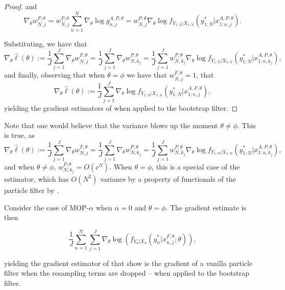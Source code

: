\documentclass{article}
\begin{document}
\begin{proof}
and 
$$\nabla_\theta w_{N,j}^{P,\theta} = w_{N,j}^{P,\theta} \sum_{n=1}^N \nabla_\theta \log g_{n,j}^{A,P,\theta} = w_{N,j}^{P,\theta} \nabla_\theta \log f_{Y_{1:N}|X_{1:N}}\left(y_{1:N}^* | x_{1:n,j}^{A, P,\theta}\right).$$

Substituting, we have that
\begin{equation*}
    \nabla_\theta \hat{\ell}(\theta) := \frac{1}{J}\sum_{j=1}^J \nabla_\theta w_{N,j}^{F,\theta} =\frac{1}{J}\sum_{j=1}^J \nabla_\theta w_{N,k_j}^{P,\theta} = \frac{1}{J}\sum_{j=1}^J w_{N,k_j}^{P,\theta} \nabla_\theta \log f_{Y_{1:N}|X_{1:N}}\left(y_{1:N}^* | x_{1:n,k_j}^{A, P,\theta}\right),
\end{equation*}
and finally, observing that when $\theta=\phi$ we have that $w_{N,j}^{F,\theta}=1$, that 
\begin{equation*}
    \nabla_\theta \hat{\ell}(\theta) := \frac{1}{J}\sum_{j=1}^J \nabla_\theta \log f_{Y_{1:N}|X_{1:N}}\left(y_{1:N}^* | x_{1:n,j}^{A, F,\theta}\right),
\end{equation*}
yielding the gradient estimators of \cite{poyiadjis11, scibior2021dpf} when applied to the bootstrap filter. 
\end{proof}

Note that one would believe that the variance blows up the moment $\theta\neq\phi$. This is true, as 
\begin{equation*}
    \nabla_\theta \hat{\ell}(\theta) := \frac{1}{J}\sum_{j=1}^J \nabla_\theta w_{N,j}^{F,\theta} =\frac{1}{J}\sum_{j=1}^J \nabla_\theta w_{N,k_j}^{P,\theta} = \frac{1}{J}\sum_{j=1}^J w_{N,k_j}^{P,\theta} \nabla_\theta \log f_{Y_{1:N}|X_{1:N}}\left(y_{1:N}^* | x_{1:n,k_j}^{A, P,\theta}\right),
\end{equation*}
and when $\theta\neq\phi$, $w_{N,k_j}^{P,\theta} = O(c^N)$. When $\theta=\phi$, this is a special case of the \cite{poyiadjis11} estimator, which has $O(N^2)$ variance by a property of functionals of the particle filter by \cite{delMoral03}. 

\begin{lem}
\label{lem:mop-0-formula}

Consider the case of MOP-$\alpha$ when $\alpha=0$ and $\theta=\phi$. The gradient estimate is then

    \begin{equation}
        \frac{1}{J} \sum_{n=1}^N \sum_{j=1}^J \nabla_\theta \log\left(f_{Y_n|X_{n}}(y_n^*|x_{n,j}^{F, \theta}; \theta)\right),
    \end{equation}

    yielding the gradient estimator of \cite{blei2018vsmc} that \cite{scibior2021dpf} show is the gradient of a vanilla particle filter when the resampling terms are dropped -- when applied to the bootstrap filter.

\end{lem}
\end{document}
